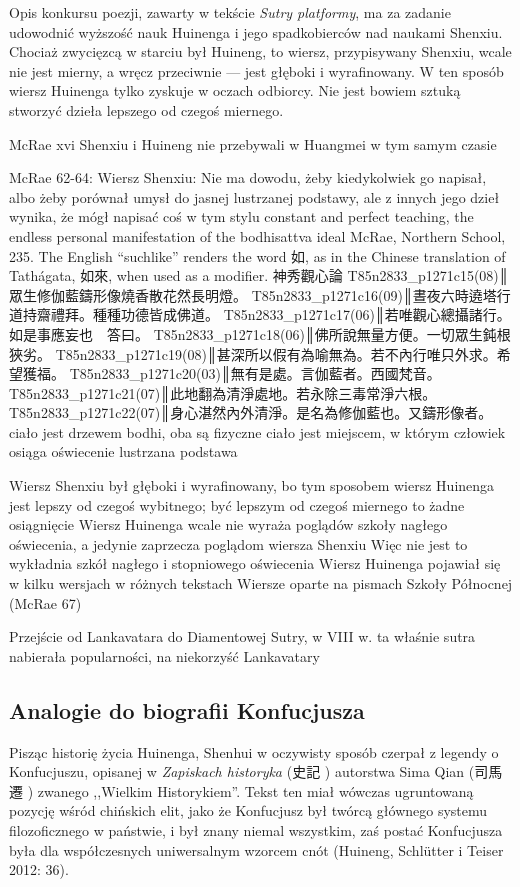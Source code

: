 Opis konkursu poezji, zawarty w tekście \textit{Sutry platformy}, ma za zadanie udowodnić wyższość nauk Huinenga i jego spadkobierców nad naukami Shenxiu. Chociaż zwycięzcą w starciu był Huineng, to wiersz, przypisywany Shenxiu, wcale nie jest mierny, a wręcz przeciwnie --- jest głęboki i wyrafinowany. W ten sposób wiersz Huinenga tylko zyskuje w oczach odbiorcy. Nie jest bowiem sztuką stworzyć dzieła lepszego od czegoś miernego.

McRae xvi
Shenxiu i Huineng nie przebywali w Huangmei w tym samym czasie

McRae 62-64:
Wiersz Shenxiu:
Nie ma dowodu, żeby kiedykolwiek go napisał, albo żeby porównał umysł do jasnej lustrzanej podstawy, ale z innych jego dzieł wynika, że mógł napisać coś w tym stylu
constant and perfect teaching, the endless personal manifestation of the
bodhisattva ideal
McRae, Northern School, 235. The English “suchlike'' renders the word 如, as in the Chinese translation of Tathágata, 如來, when used as a modifier.
神秀觀心論
T85n2833_p1271c15(08)║眾生修伽藍鑄形像燒香散花然長明燈。
T85n2833_p1271c16(09)║晝夜六時遶塔行道持齋禮拜。種種功德皆成佛道。
T85n2833_p1271c17(06)║若唯觀心總攝諸行。如是事應妄也　答曰。
T85n2833_p1271c18(06)║佛所說無量方便。一切眾生鈍根狹劣。
T85n2833_p1271c19(08)║甚深所以假有為喻無為。若不內行唯只外求。希望獲福。
T85n2833_p1271c20(03)║無有是處。言伽藍者。西國梵音。
T85n2833_p1271c21(07)║此地翻為清淨處地。若永除三毒常淨六根。
T85n2833_p1271c22(07)║身心湛然內外清淨。是名為修伽藍也。又鑄形像者。
ciało jest drzewem bodhi, oba są fizyczne
ciało jest miejscem, w którym człowiek osiąga oświecenie
lustrzana podstawa

Wiersz Shenxiu był głęboki i wyrafinowany, bo tym sposobem wiersz Huinenga jest lepszy od czegoś wybitnego; być lepszym od czegoś miernego to żadne osiągnięcie
Wiersz Huinenga wcale nie wyraża poglądów szkoły nagłego oświecenia, a jedynie zaprzecza poglądom wiersza Shenxiu
Więc nie jest to wykładnia szkół nagłego i stopniowego oświecenia
Wiersz Huinenga pojawiał się w kilku wersjach w różnych tekstach
Wiersze oparte na pismach Szkoły Północnej (McRae 67)

Przejście od Lankavatara do Diamentowej Sutry, w VIII w. ta właśnie sutra nabierała popularności, na niekorzyść Lankavatary
\fi
\subsection{Analogie do biografii Konfucjusza}
Pisząc historię życia Huinenga, Shenhui w oczywisty sposób czerpał z legendy o Konfucjuszu, opisanej w \textit{Zapiskach historyka} (史記 ) autorstwa Sima Qian (司馬遷 ) zwanego ,,Wielkim Historykiem''. Tekst ten miał wówczas ugruntowaną pozycję wśród chińskich elit, jako że Konfucjusz był twórcą głównego systemu filozoficznego w państwie, i był znany niemal wszystkim, zaś postać Konfucjusza była dla współczesnych uniwersalnym wzorcem cnót (Huineng, Schlütter i Teiser 2012: 36).

